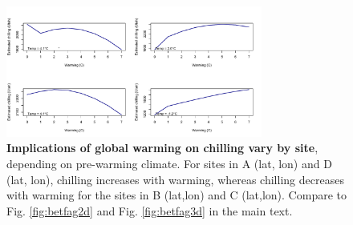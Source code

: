 \documentclass{article}
\begin{document}
\begin{figure}[h!]
\centering
\noindent \includegraphics[width=0.75\textwidth]{..//..//analyses/bb_analysis/figures/forecasting/chillforecast_bothspp_PEP_utah.pdf}
\caption{\textbf{Implications of global warming on chilling vary by site}, depending on pre-warming climate. For sites in A (lat, lon) and D (lat, lon), chilling increases with warming, whereas chilling decreases with warming for the sites in B (lat,lon) and C (lat,lon). Compare to Fig. \ref{fig:betfag2d} and Fig. \ref{fig:betfag3d} in the main text.}
\label{fig:chillfore}
\end{figure}

\end{document}
